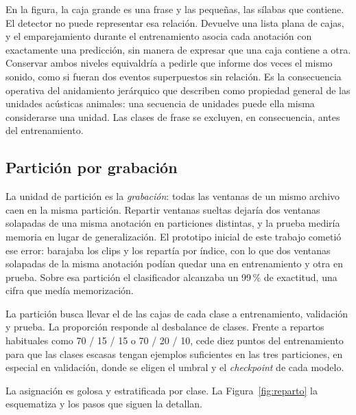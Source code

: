 En la figura, la caja grande es una frase \nestingPhrase{} y las pequeñas, las
sílabas \nestingSyllable{} que contiene. El detector no puede representar esa
relación. Devuelve una lista plana de cajas,
y el emparejamiento durante el entrenamiento asocia cada anotación con
exactamente una predicción, sin manera de expresar que una caja contiene a otra.
Conservar ambos niveles equivaldría a pedirle que informe dos veces el mismo
sonido, como si fueran dos eventos superpuestos sin relación. Es la consecuencia
operativa del anidamiento jerárquico que \citet{kershenbaum_acoustic_2016}
describen como propiedad general de las unidades acústicas animales: una
secuencia de unidades puede ella misma considerarse una unidad. Las clases de
frase se excluyen, en consecuencia, antes del entrenamiento.

\subsection{Partición por grabación}
\label{sec:particion}

 La unidad de partición es la \emph{grabación}: todas las ventanas
de un mismo archivo caen en la misma partición. Repartir ventanas sueltas dejaría
dos ventanas solapadas de una misma anotación en particiones distintas, y la
prueba mediría memoria en lugar de generalización. El prototipo inicial de este
trabajo cometió ese error: barajaba los clips y los repartía por índice, con lo que dos ventanas
solapadas de la misma anotación podían quedar una en entrenamiento y otra en
prueba. Sobre esa partición el clasificador alcanzaba un 99\,\% de exactitud, una
cifra que medía memorización.

 La partición busca llevar el \splitRatios{} de las cajas de
cada clase a entrenamiento, validación y prueba. La proporción responde al
desbalance de clases. Frente a repartos habituales como 70 / 15 / 15 o
70 / 20 / 10, cede diez puntos del entrenamiento para que las clases escasas
tengan ejemplos suficientes en las tres particiones, en especial en validación,
donde se eligen el umbral y el \textit{checkpoint} de cada modelo.

 La asignación es golosa y estratificada por clase. La
Figura~\ref{fig:reparto} la esquematiza y los pasos que siguen la detallan.

